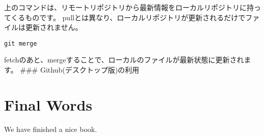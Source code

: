 \documentclass[
]{book}
\begin{document}
上のコマンドは、リモートリポジトリから最新情報をローカルリポジトリに持ってくるものです。
pullとは異なり、ローカルリポジトリが更新されるだけでファイルは更新されません。

\begin{verbatim}
git merge
\end{verbatim}

fetchのあと、mergeすることで、ローカルのファイルが最新状態に更新されます。
\#\#\# Github(デスクトップ版)の利用

\hypertarget{final-words}{%
\chapter{Final Words}\label{final-words}}

We have finished a nice book.

  
\end{document}

